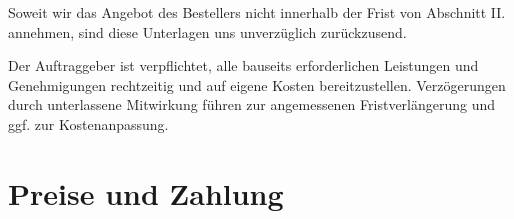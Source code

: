 \documentclass[fontsize=12pt,parskip=half]{scrartcl}
\begin{document}
\begin{contract}
Soweit wir das Angebot des Bestellers nicht innerhalb der Frist von Abschnitt II. annehmen, sind diese Unterlagen uns unverzüglich zurückzusend.

\Clause[title={Mitwirkungspflichten des Auftraggebers}]

Der Auftraggeber ist verpflichtet, alle bauseits erforderlichen Leistungen und Genehmigungen rechtzeitig und auf eigene Kosten bereitzustellen. Verzögerungen durch unterlassene Mitwirkung führen zur angemessenen Fristverlängerung und ggf. zur Kostenanpassung.

\end{contract}

\section{Preise und Zahlung}
\end{document}
